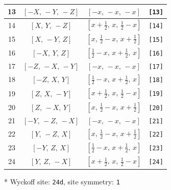 \documentclass[fleqn,8pt]{jsarticle}
\begin{document}
\begin{longtable}{cccc}
13 & $\left[ - X,\, - Y,\, - Z \right]$ & $\left[ - x,\, - x,\, - x \right]$ & {\tt [13]} \\ \hline
14 & $\left[ X,\, Y,\, - Z \right]$ & $\left[ x + \frac{1}{2},\, x,\, \frac{1}{2} - x \right]$ & {\tt [14]} \\ \hline
15 & $\left[ X,\, - Y,\, Z \right]$ & $\left[ x,\, \frac{1}{2} - x,\, x + \frac{1}{2} \right]$ & {\tt [15]} \\ \hline
16 & $\left[ - X,\, Y,\, Z \right]$ & $\left[ \frac{1}{2} - x,\, x + \frac{1}{2},\, x \right]$ & {\tt [16]} \\ \hline
17 & $\left[ - Z,\, - X,\, - Y \right]$ & $\left[ - x,\, - x,\, - x \right]$ & {\tt [17]} \\ \hline
18 & $\left[ - Z,\, X,\, Y \right]$ & $\left[ \frac{1}{2} - x,\, x + \frac{1}{2},\, x \right]$ & {\tt [18]} \\ \hline
19 & $\left[ Z,\, X,\, - Y \right]$ & $\left[ x + \frac{1}{2},\, x,\, \frac{1}{2} - x \right]$ & {\tt [19]} \\ \hline
20 & $\left[ Z,\, - X,\, Y \right]$ & $\left[ x,\, \frac{1}{2} - x,\, x + \frac{1}{2} \right]$ & {\tt [20]} \\ \hline
21 & $\left[ - Y,\, - Z,\, - X \right]$ & $\left[ - x,\, - x,\, - x \right]$ & {\tt [21]} \\ \hline
22 & $\left[ Y,\, - Z,\, X \right]$ & $\left[ x,\, \frac{1}{2} - x,\, x + \frac{1}{2} \right]$ & {\tt [22]} \\ \hline
23 & $\left[ - Y,\, Z,\, X \right]$ & $\left[ \frac{1}{2} - x,\, x + \frac{1}{2},\, x \right]$ & {\tt [23]} \\ \hline
24 & $\left[ Y,\, Z,\, - X \right]$ & $\left[ x + \frac{1}{2},\, x,\, \frac{1}{2} - x \right]$ & {\tt [24]} \\
\end{longtable}
* Wyckoff site: {\tt 24d}, site symmetry: {\tt 1}
\renewcommand{\arraystretch}{1.2}
\end{document}
